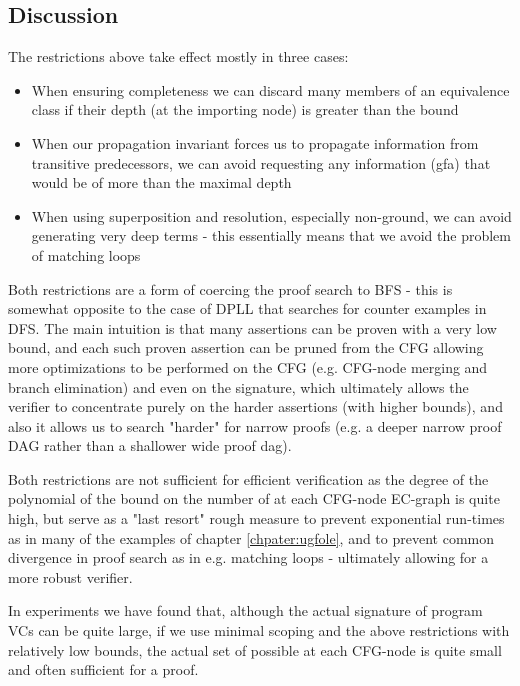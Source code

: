 \subsection{Discussion}
The restrictions above take effect mostly in three cases:
\begin{itemize}
	\item When ensuring \GFA{} completeness we can discard many members of an equivalence class if their depth (at the importing node) is greater than the bound
	\item When our propagation invariant forces us to propagate information from transitive predecessors, we can avoid requesting any information (gfa) that would be of more than the maximal depth
	\item When using superposition and resolution, especially non-ground, we can avoid generating very deep terms - this essentially means that we avoid the problem of matching loops
\end{itemize}

Both restrictions are a form of coercing the proof search to BFS - this is somewhat opposite to the case of DPLL that searches for counter examples in DFS. 
The main intuition is that many assertions can be proven with a very low bound, and each such proven assertion can be pruned from the CFG allowing more optimizations to be performed on the CFG (e.g. CFG-node merging and branch elimination) and even on the signature, which ultimately allows the verifier to concentrate purely on the harder assertions (with higher bounds), and also it allows us to search "harder" for narrow proofs
(e.g. a deeper narrow proof DAG rather than a shallower wide proof dag).

Both restrictions are not sufficient for efficient verification as the degree of the polynomial of the bound on the number of \GFAs{} at each CFG-node EC-graph is quite high, but serve as a "last resort" rough measure to prevent exponential run-times as in many of the examples of chapter \ref{chpater:ugfole}, and to prevent common divergence in proof search as in e.g. matching loops - ultimately allowing for a more robust verifier.

In experiments we have found that, although the actual signature of program VCs can be quite large, 
if we use minimal scoping and the above restrictions with relatively low bounds, the actual set of possible \GFAs{} at each CFG-node is quite small and often sufficient for a proof. 

